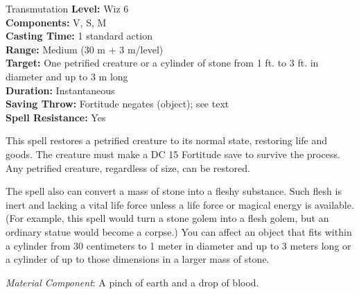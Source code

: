 {Transmutation}
{
	\textbf{Level:}
	Wiz 6\\
	\textbf{Components:}
	V, S, M\\
	\textbf{Casting Time:}
	1 standard action\\
	\textbf{Range:}
	Medium (30 m + 3 m/level)\\
	\textbf{Target:}
	One petrified creature or a cylinder of stone from 1 ft. to 3 ft. in diameter and up to 3 m long\\
	\textbf{Duration:}
	Instantaneous\\
	\textbf{Saving Throw:}
	Fortitude negates (object); see text\\
	\textbf{Spell Resistance:}
	Yes\\
}
{
	This spell restores a petrified creature to its normal state, restoring life and goods. The creature must make a DC 15 Fortitude save to survive the process. Any petrified creature, regardless of size, can be restored.

	The spell also can convert a mass of stone into a fleshy substance. Such flesh is inert and lacking a vital life force unless a life force or magical energy is available. (For example, this spell would turn a stone golem into a flesh golem, but an ordinary statue would become a corpse.) You can affect an object that fits within a cylinder from 30 centimeters to 1 meter in diameter and up to 3 meters long or a cylinder of up to those dimensions in a larger mass of stone.

	\textit{Material Component}:
	A pinch of earth and a drop of blood.

}
